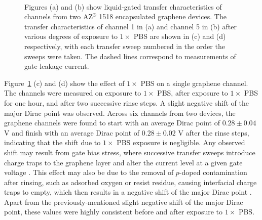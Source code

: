 \documentclass[
  a4paper,
]{scrbook}
\begin{document}
\begin{figure}
\begin{minipage}[t]{0.45\linewidth}
{{}

}

\end{minipage}%
%
\begin{minipage}[t]{0.01\linewidth}

{\centering 

~

}

\end{minipage}%

\caption[Liquid-gated transfer characteristics of channels from two
encapsulated graphene devices, alongside the change in transfer
characteristics upon various degrees of exposure to \(1 \times\)
PBS.]{\label{fig-pristine-graphene}Figures (a) and (b) show liquid-gated
transfer characteristics of channels from two AZ\(^\circledR\) 1518
encapsulated graphene devices. The transfer characteristics of channel 1
in (a) and channel 5 in (b) after various degrees of exposure to
\(1 \times\) PBS are shown in (c) and (d) respectively, with each
transfer sweep numbered in the order the sweeps were taken. The dashed
lines correspond to measurements of gate leakage current.}

\end{figure}

Figure~\ref{fig-pristine-graphene} (c) and (d) show the effect of
\(1 \times\) PBS on a single graphene channel. The channels were
measured on exposure to \(1 \times\) PBS, after exposure to \(1 \times\)
PBS for one hour, and after two successive rinse steps. A slight
negative shift of the major Dirac point was observed. Across six
channels from two devices, the graphene channels were found to start
with an average Dirac point of \(0.28 \pm 0.04\) V and finish with an
average Dirac point of \(0.28 \pm 0.02\) V after the rinse steps,
indicating that the shift due to \(1 \times\) PBS exposure is
negligible. Any observed shift may result from gate bias stress, where
successive transfer sweeps introduce charge traps to the graphene layer
and alter the current level at a given gate voltage
\autocite{Bargaoui2018,Noyce2019}. This effect may also be due to the
removal of \(p\)-doped contamination after rinsing, such as adsorbed
oxygen or resist residue, causing interfacial charge traps to empty,
which then results in a negative shift of the major Dirac point
\autocite{Bartolomeo2011,Kireev2017,Peng2018}. Apart from the
previously-mentioned slight negative shift of the major Dirac point,
these values were highly consistent before and after exposure to
\(1 \times\) PBS.
\end{document}
